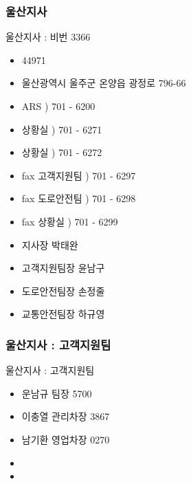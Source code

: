\documentclass[aspectratio=1610,20pt,xcolor=pdftex,dvipsnames,table,handout]{beamer}
\begin{document}
		\begin{frame} [t,plain]
		\frametitle{울산지사 }

			\begin{block} {울산지사 : 비번 3366 }
			\setlength{\leftmargini}{2em}			
			\begin{itemize}
				\item 44971
				\item 울산광역시 울주군 온양읍 광정로 796-66 \\
			\end{itemize}

			\begin{itemize}
				\item ARS ) 701 -  6200 
				\item 상황실  ) 701 -  6271
				\item 상황실  ) 701 -  6272
			\end{itemize}

			\begin{itemize}
				\item fax 고객지원팀 ) 701 -  6297
				\item fax 도로안전팀 ) 701 -  6298
				\item fax 상황실 ) 701 -  6299
			\end{itemize}

			\begin{itemize}
				\item 지사장 \hrulefill 박태완
				\item 고객지원팀장 \hrulefill 윤남구
				\item 도로안전팀장 \hrulefill 손정줄
				\item 교통안전팀장 \hrulefill 하규영
			\end{itemize}
			\end{block}						





		\end{frame}						

		\begin{frame} [t,plain]
		\frametitle{울산지사 : 고객지원팀 }

			\begin{block} {울산지사 : 고객지원팀 }
			\setlength{\leftmargini}{2em}			
			\begin{itemize}
				\item 운남규 팀장 	 5700
				\item 이충열 관리차장  3867
				\item 남기환	영업차장	 0270
				\item 
				\item 
			\end{itemize}
			\end{block}						

		\end{frame}						
\end{document}
